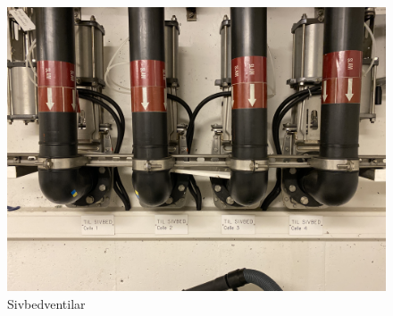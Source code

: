 \begin{figure}[htbp]
    \centering
    \includegraphics[width=1\textwidth]{Bilder/SivbedSande.jpg}
    \caption{Sivbedventilar}\label{fig:SivbedVentilar}
\end{figure}

\newpage



